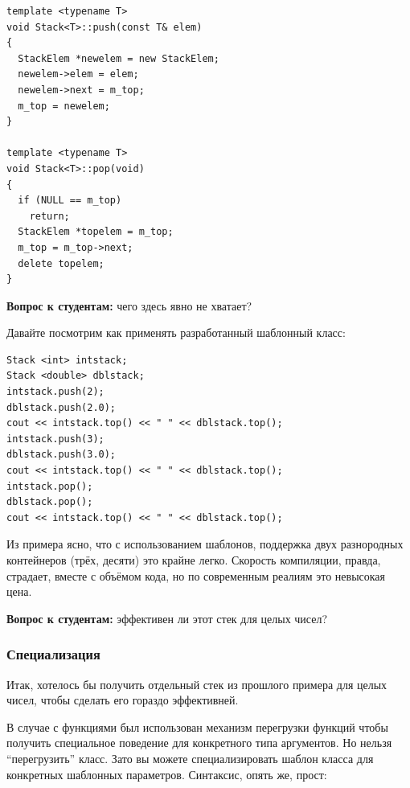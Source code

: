 \documentclass[a4paper,12pt,oneside]{article}
\newif\ifanswers
\begin{document}
\begin{lstlisting}
template <typename T>
void Stack<T>::push(const T& elem)
{
  StackElem *newelem = new StackElem;
  newelem->elem = elem;
  newelem->next = m_top;
  m_top = newelem;
}

template <typename T>
void Stack<T>::pop(void)
{
  if (NULL == m_top)
    return;
  StackElem *topelem = m_top;
  m_top = m_top->next;
  delete topelem;
}
\end{lstlisting}

\textbf{Вопрос к студентам:} чего здесь явно не хватает?

\ifanswers
Ожидается хоровой ответ: деструктор, копирующий конструктор и оператор присваивания. Позвать кого-нибудь к доске разобрать как их писать.
\fi

Давайте посмотрим как применять разработанный шаблонный класс:

\begin{lstlisting}
Stack <int> intstack;
Stack <double> dblstack;
intstack.push(2);
dblstack.push(2.0);
cout << intstack.top() << " " << dblstack.top();
intstack.push(3);
dblstack.push(3.0);
cout << intstack.top() << " " << dblstack.top();
intstack.pop();
dblstack.pop();
cout << intstack.top() << " " << dblstack.top();
\end{lstlisting}

Из примера ясно, что с использованием шаблонов, поддержка двух разнородных контейнеров (трёх, десяти) это крайне легко. Скорость компиляции, правда, страдает, вместе с объёмом кода, но по современным реалиям это невысокая цена.

\textbf{Вопрос к студентам:} эффективен ли этот стек для целых чисел?

\ifanswers
Вообще-то совсем не эффективен. Для целых чисел здесь хотелось бы, например, обычного массива, чтобы не тратиться на указатели.
\fi

\subsubsection{Специализация}\label{TemplateSpec}

Итак, хотелось бы получить отдельный стек из прошлого примера для целых чисел, чтобы сделать его гораздо эффективней.

В случае с функциями был использован механизм перегрузки функций чтобы получить специальное поведение для конкретного типа аргументов. Но нельзя ``перегрузить'' класс. Зато вы можете специализировать шаблон класса для конкретных шаблонных параметров. Синтаксис, опять же, прост:
\end{document}
